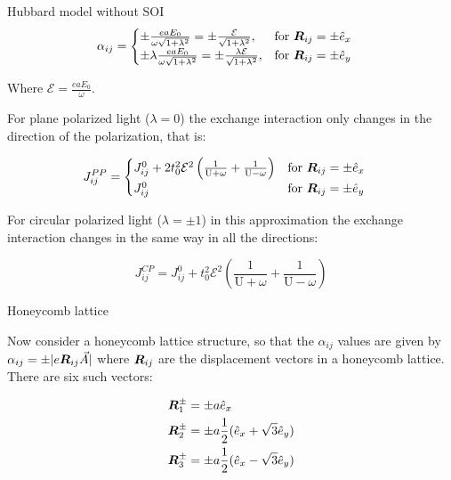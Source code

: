 \begin{section}{Hubbard model without SOI}
\begin{equation}
\alpha_{ij} = \begin{cases}
             \pm \frac{eaE_0}{\omega \sqrt{1+\lambda^2}} = \pm \frac{\mathcal{E}}{\sqrt{1+\lambda^2}},  & \text{for } \boldsymbol{R}_{ij} = \pm \hat{e}_x \\
             \pm \lambda\frac{eaE_0}{\omega \sqrt{1+\lambda^2}} = \pm \frac{\lambda \mathcal{E}}{\sqrt{1+\lambda^2}},  & \text{for } \boldsymbol{R}_{ij} = \pm \hat{e}_y
       \end{cases} \quad
\end{equation}

Where $\mathcal{E} = \frac{eaE_0}{\omega}$. 

For plane polarized light ($\lambda = 0$) the exchange interaction only changes in the direction of the polarization, that is:

\begin{equation}
J_{ij}^{PP} = \begin{cases}
		J_{ij}^0 + 2t_0^2 \mathcal{E}^2 \left( \frac{1}{\text{U}+\omega} + \frac{1}{\text{U}-\omega} \right) & \text{for } \boldsymbol{R}_{ij} = \pm \hat{e}_x \\
J_{ij}^0 & \text{for } \boldsymbol{R}_{ij} = \pm \hat{e}_y
\end{cases} \quad 
\end{equation}

For circular polarized light ($\lambda=\pm1$) in this approximation the exchange interaction changes in the same way in all the directions:

\begin{equation}
\label{JijCPSQUARE}
J_{ij}^{CP} = J_{ij}^0 + t_0^2 \mathcal{E}^2 \left( \frac{1}{\text{U}+\omega} + \frac{1}{\text{U}-\omega} \right)
\end{equation}

\begin{subsection}{Honeycomb lattice}

Now consider a honeycomb lattice structure, so that the $\alpha_{ij}$ values are given by $\alpha_{ij} = \pm|e\boldsymbol{R}_{ij}\vec{A}|$ where $\boldsymbol{R}_{ij}$ are the displacement vectors in a honeycomb lattice. There are six such vectors:

\begin{align}
\boldsymbol{R}_1^\pm &= \pm a\hat{e}_x \\
\boldsymbol{R}_2^\pm &= \pm a\frac{1}{2}(\hat{e}_x + \sqrt{3}\hat{e}_y) \\
\boldsymbol{R}_3^\pm &= \pm a\frac{1}{2}(\hat{e}_x - \sqrt{3}\hat{e}_y)
\end{align}


\end{subsection}
\end{section}
